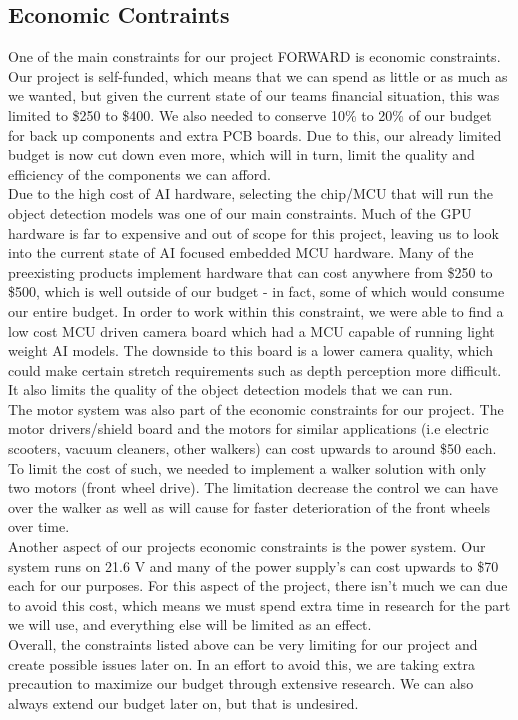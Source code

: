 \subsection{Economic Contraints}
\noindent One of the main constraints for our project FORWARD is economic constraints. Our project is self-funded, which means that we can spend as little or as much as we wanted, but given the current state of our teams financial situation, this was limited to \$250 to \$400. We also needed to conserve 10\% to 20\% of our budget for back up components and extra PCB boards. Due to this, our already limited budget is now cut down even more, which will in turn, limit the quality and efficiency of the components we can afford. \\

\noindent Due to the high cost of AI hardware, selecting the chip/MCU that will run the object detection models was one of our main constraints. Much of the GPU hardware is far to expensive and out of scope for this project, leaving us to look into the current state of AI focused embedded MCU hardware. Many of the preexisting products implement hardware that can cost anywhere from \$250 to \$500, which is well outside of our budget - in fact, some of which would consume our entire budget. In order to work within this constraint, we were able to find a low cost MCU driven camera board which had a MCU capable of running light weight AI models. The downside to this board is a lower camera quality, which could make certain stretch requirements such as depth perception more difficult. It also limits the quality of the object detection models that we can run. \\

\noindent The motor system was also part of the economic constraints for our project. The motor drivers/shield board and the motors for similar applications (i.e electric scooters, vacuum cleaners, other walkers) can cost upwards to around \$50 each. To limit the cost of such, we needed to implement a walker solution with only two motors (front wheel drive). The limitation decrease the control we can have over the walker as well as will cause for faster deterioration of the front wheels over time. \\

\noindent Another aspect of our projects economic constraints is the power system. Our system runs on 21.6 V and many of the power supply's can cost upwards to \$70 each for our purposes. For this aspect of the project, there isn't much we can due to avoid this cost, which means we must spend extra time in research for the part we will use, and everything else will be limited as an effect. \\

\noindent Overall, the constraints listed above can be very limiting for our project and create possible issues later on. In an effort to avoid this, we are taking extra precaution to maximize our budget through extensive research. We can also always extend our budget later on, but that is undesired. \\